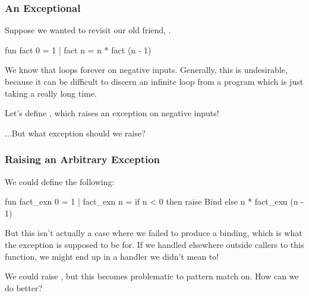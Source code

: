 \documentclass[aspectratio=169]{beamer}
\begin{document}


\begin{frame}[fragile]
  \frametitle{An Exceptional }

  Suppose we wanted to revisit our old friend, .

  \begin{codeblock}
    fun fact 0 = 1
      | fact n = n * fact (n - 1)
  \end{codeblock}

  \pause
  \vspace{\fill}

  We know that  loops forever on negative inputs. Generally,
  this is undesirable, because it can be difficult to discern an infinite
  loop from a program which is just taking a really long time.

  \pause
  \vspace{\fill}

  Let's define \footnotemark, which raises an exception on negative inputs!

  \pause
  \vspace{\fill}

  ...But what exception should we raise?

\end{frame}

\begin{frame}[fragile]
  \frametitle{Raising an Arbitrary Exception}

  We could define the following: 
  \begin{codeblock}
    fun fact_exn 0 = 1
      | fact_exn n = 
          if n < 0 then 
            raise Bind
          else
            n * fact_exn (n - 1)
  \end{codeblock}
  
  \pause
  \vspace{\fill}

  But this isn't actually a case where we failed to produce a binding, which
  is what the  exception is supposed to be for. If we handled
   elsewhere outside callers to this function, we might end up
  in a handler we didn't mean to! 

  \pause
  \vspace{\fill}

  We could raise , but this becomes problematic
  to pattern match on. How can we do better?
\end{frame}
\end{document}
